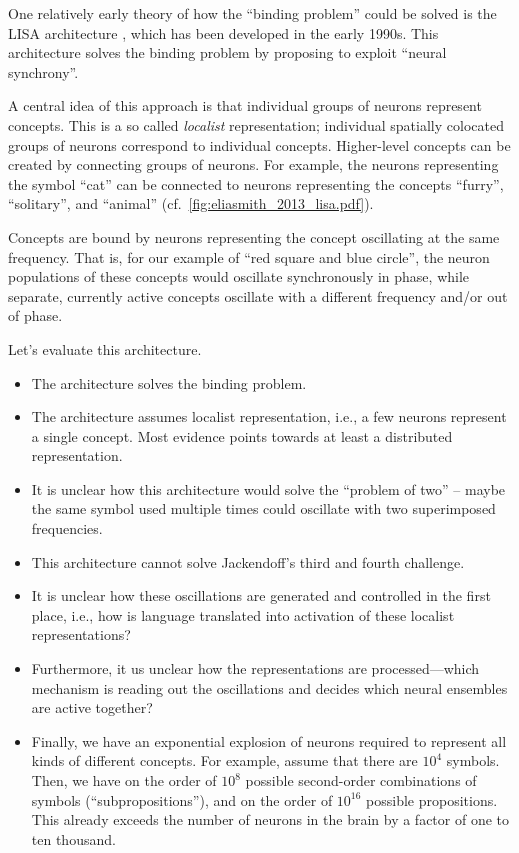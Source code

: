 \documentclass[10pt,letterpaper,oneside]{article}
\begin{document}
One relatively early theory of how the \enquote{binding problem} could be solved is the LISA architecture \cite{hummel2003symbolicconnectionist}, which has been developed in the early 1990s. This architecture solves the binding problem by proposing to exploit \enquote{neural synchrony}.

A central idea of this approach is that individual groups of neurons represent concepts. This is a so called \emph{localist} representation; individual spatially colocated groups of neurons correspond to individual concepts. Higher-level concepts can be created by connecting groups of neurons. For example, the neurons representing the symbol \enquote{cat} can be connected to neurons representing the concepts \enquote{furry}, \enquote{solitary}, and \enquote{animal} (cf.~\cref{fig:eliasmith_2013_lisa.pdf}).

Concepts are bound by neurons representing the concept oscillating at the same frequency. That is, for our example of \enquote{red square and blue circle}, the neuron populations of these concepts would oscillate synchronously in phase, while separate, currently active concepts oscillate with a different frequency and/or out of phase.

\newpage

Let's evaluate this architecture.
\begin{itemize}
	\item[\OPlus] The architecture solves the binding problem.
	\item[\OMeh] The architecture assumes localist representation, i.e., a few neurons represent a single concept. Most evidence points towards at least a distributed representation.
	\item[\OMeh] It is unclear how this architecture would solve the \enquote{problem of two} -- maybe the same symbol used multiple times could oscillate with two superimposed frequencies.
	\item[\OMeh] This architecture cannot solve Jackendoff's third and fourth challenge.
	\item[\OMinus] It is unclear how these oscillations are generated and controlled in the first place, i.e., how is language translated into activation of these localist representations?
	\item[\OMinus] Furthermore, it us unclear how the representations are processed---which mechanism is reading out the oscillations and decides which neural ensembles are active together?
	\item[\OMinus] Finally, we have an exponential explosion of neurons required to represent all kinds of different concepts. For example, assume that there are $10^4$ symbols. Then, we have on the order of $10^8$ possible second-order combinations of symbols (\enquote{subpropositions}), and on the order of $10^{16}$ possible propositions. This already exceeds the number of neurons in the brain by a factor of one to ten thousand.
\end{itemize}
\end{document}
